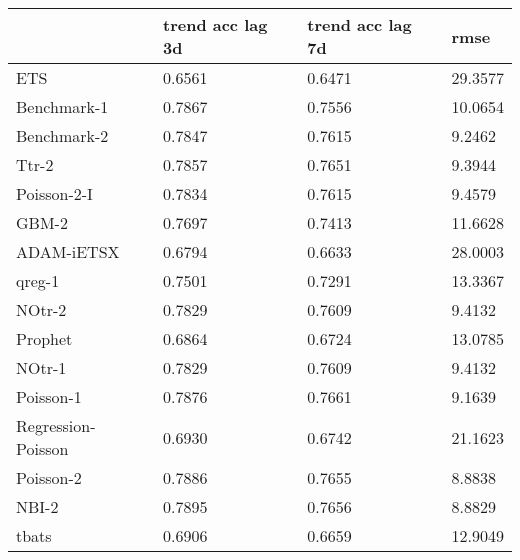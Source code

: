 \begin{tabular}{llll}
\toprule
 & trend acc lag 3d & trend acc lag 7d & rmse \\
\midrule
ETS & 0.6561 & 0.6471 & 29.3577 \\
Benchmark-1 & 0.7867 & 0.7556 & 10.0654 \\
Benchmark-2 & 0.7847 & 0.7615 & 9.2462 \\
Ttr-2 & 0.7857 & 0.7651 & 9.3944 \\
Poisson-2-I & 0.7834 & 0.7615 & 9.4579 \\
GBM-2 & 0.7697 & 0.7413 & 11.6628 \\
ADAM-iETSX & 0.6794 & 0.6633 & 28.0003 \\
qreg-1 & 0.7501 & 0.7291 & 13.3367 \\
NOtr-2 & 0.7829 & 0.7609 & 9.4132 \\
Prophet & 0.6864 & 0.6724 & 13.0785 \\
NOtr-1 & 0.7829 & 0.7609 & 9.4132 \\
Poisson-1 & 0.7876 & 0.7661 & 9.1639 \\
Regression-Poisson & 0.6930 & 0.6742 & 21.1623 \\
Poisson-2 & 0.7886 & 0.7655 & 8.8838 \\
NBI-2 & 0.7895 & 0.7656 & 8.8829 \\
tbats & 0.6906 & 0.6659 & 12.9049 \\
\bottomrule
\end{tabular}
